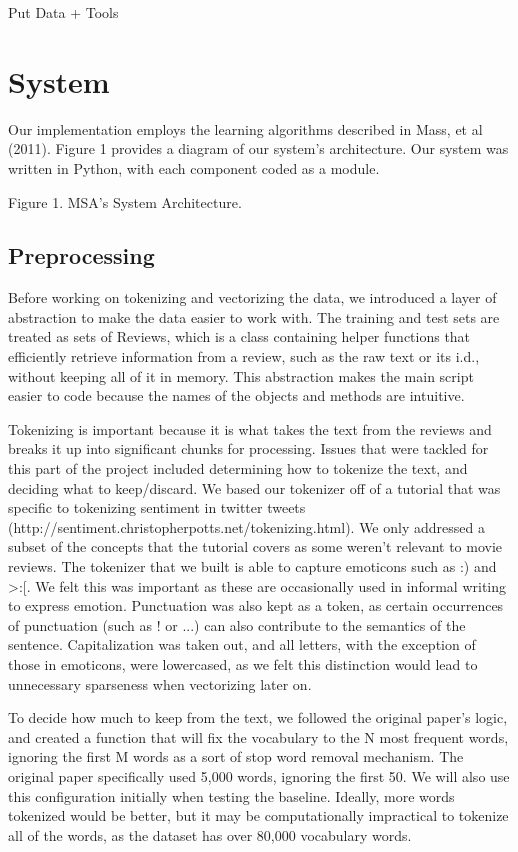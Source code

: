 \documentclass[11pt,letterpaper]{article}
\begin{document}
Put Data + Tools

\section{System}

Our implementation employs the learning algorithms described in Mass, et al (2011). Figure 1 provides a diagram of our system’s architecture. Our system was written in Python, with each component coded as a module.


Figure 1. MSA’s System Architecture.

\subsection{Preprocessing}

Before working on tokenizing and vectorizing the data, we introduced a layer of abstraction to make the data easier to work with. The training and test sets are treated as sets of Reviews, which is a class containing helper functions that efficiently retrieve information from a review, such as the raw text or its i.d., without keeping all of it in memory. This abstraction makes the main script easier to code because the names of the objects and methods are intuitive.

Tokenizing is important because it is what takes the text from the reviews and breaks it up into significant chunks for processing. Issues that were tackled for this part of the project included determining how to tokenize the text, and deciding what to keep/discard. We based our tokenizer off of a tutorial that was specific to tokenizing sentiment in twitter tweets (http://sentiment.christopherpotts.net/tokenizing.html). We only addressed a subset of the concepts that the tutorial covers as some weren't relevant to movie reviews. The tokenizer that we built is able to capture emoticons such as :) and >:[. We felt this was important as these are occasionally used in informal writing to express emotion. Punctuation was also kept as a token, as certain occurrences of punctuation (such as ! or ...) can also contribute to the semantics of the sentence. Capitalization was taken out, and all letters, with the exception of those in emoticons, were lowercased, as we felt this distinction would lead to unnecessary sparseness when vectorizing later on.

To decide how much to keep from the text, we followed the original paper's logic, and created a function that will fix the vocabulary to the N most frequent words, ignoring the first M words as a sort of stop word removal mechanism. The original paper specifically used 5,000 words, ignoring the first 50. We will also use this configuration initially when testing the baseline. Ideally, more words tokenized would be better, but it may be computationally impractical to tokenize all of the words, as the dataset has over 80,000 vocabulary words.
\end{document}

